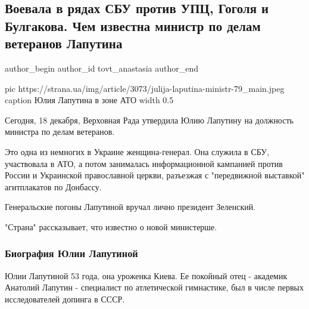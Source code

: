  
 
 
 
 
 
\subsection{Воевала в рядах СБУ против УПЦ, Гоголя и Булгакова. Чем известна министр по делам ветеранов Лапутина}
\label{sec:18_12_2020.news.ua.strana.tovt_anastasia.1.julia_laputina}
\ifcmt
	author_begin
   author_id tovt_anastasia
	author_end
\fi

\ifcmt
  pic https://strana.ua/img/article/3073/julija-laputina-ministr-79_main.jpeg
  caption Юлия Лапутина в зоне АТО 
  width 0.5
\fi


Сегодня, 18 декабря, Верховная Рада утвердила Юлию Лапутину на должность
министра по делам ветеранов.

Это одна из немногих в Украине женщина-генерал. Она служила в СБУ, участвовала
в АТО, а потом занималась информационной кампанией против России и Украинской
православной церкви, разъезжая с "передвижной выставкой" агитплакатов по
Донбассу. 

Генеральские погоны Лапутиной вручал лично президент Зеленский. 

"Страна" рассказывает, что известно о новой министерше.  

\subsubsection{Биография Юлии Лапутиной}

Юлии Лапутиной 53 года, она уроженка Киева. Ее покойный отец - академик
Анатолий Лапутин - специалист по атлетической гимнастике, был в числе первых
исследователей допинга в СССР.

